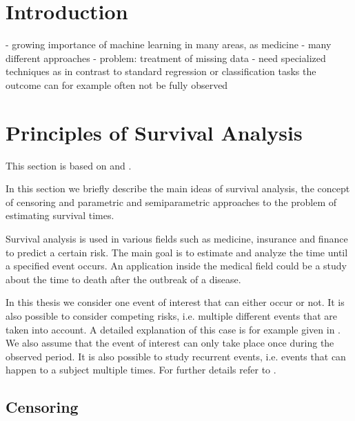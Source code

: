 \documentclass[12pt, a4paper]{article}
\theoremstyle{definition}
\theoremstyle{plain}
\numberwithin{equation}{section}
\numberwithin{figure}{section}
\numberwithin{table}{section}
\begin{document}
	
	\thispagestyle{plain}
	\tableofcontents
	\newpage

	
	\section{Introduction} \label{introduction}
	- growing importance of machine learning in many areas, as medicine
	- many different approaches
	- problem: treatment of missing data
	- need specialized techniques as in contrast to standard regression or classification tasks the outcome can for example often not be fully observed
	
	\newpage
	
	\section{Principles of Survival Analysis}
	This section is based on \citet*{sabook} and \citet*{mathsabook}.
	
	In this section we briefly describe the main ideas of survival analysis, the concept of censoring and parametric and semiparametric approaches to the problem of estimating survival times.
	
	Survival analysis is used in various fields such as medicine, insurance and finance to predict a certain risk.
	The main goal is to estimate and analyze the time until a specified event occurs.
	An application inside the medical field could be a study about the time to death after the outbreak of a disease.
	
	
	In this thesis we consider one event of interest that can either occur or not.
	It is also possible to consider competing risks, i.e. multiple different events that are taken into account.
	A detailed explanation of this case is for example given in \citet*[chapter~8]{bookfailuretime}.
	We also assume that the event of interest can only take place once during the observed period.
	It is also possible to study recurrent events, i.e. events that can happen to a subject multiple times.
	For further details refer to \citet*[chapter~9]{bookfailuretime}.
	
	\subsection{Censoring} \label{censoring}
	
\end{document}
